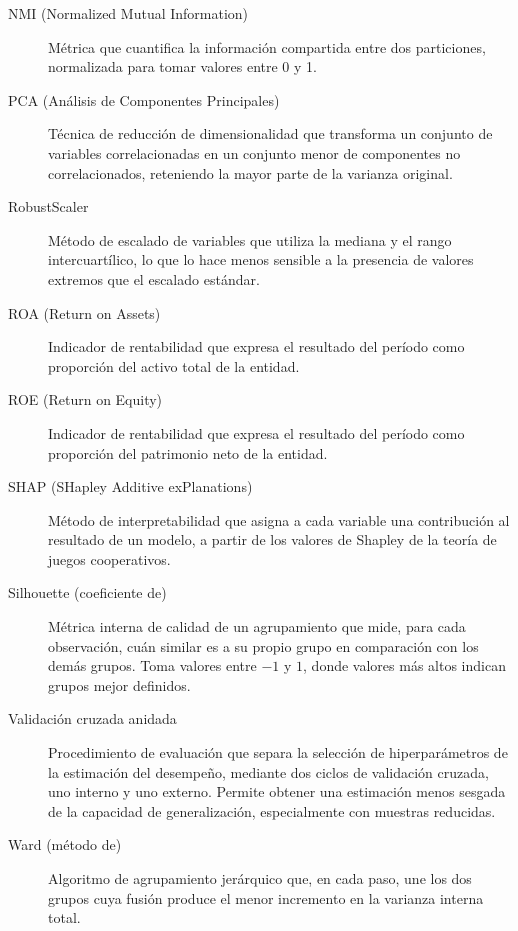 \documentclass[11pt,a4paper]{article}
\begin{document}
\begin{description}
  \item[NMI (Normalized Mutual Information)] Métrica que cuantifica la información compartida
  entre dos particiones, normalizada para tomar valores entre 0 y 1.

  \item[PCA (Análisis de Componentes Principales)] Técnica de reducción de dimensionalidad que
  transforma un conjunto de variables correlacionadas en un conjunto menor de componentes no
  correlacionados, reteniendo la mayor parte de la varianza original.

  \item[RobustScaler] Método de escalado de variables que utiliza la mediana y el rango
  intercuartílico, lo que lo hace menos sensible a la presencia de valores extremos que el
  escalado estándar.

  \item[ROA (Return on Assets)] Indicador de rentabilidad que expresa el resultado del período
  como proporción del activo total de la entidad.

  \item[ROE (Return on Equity)] Indicador de rentabilidad que expresa el resultado del período
  como proporción del patrimonio neto de la entidad.

  \item[SHAP (SHapley Additive exPlanations)] Método de interpretabilidad que asigna a cada
  variable una contribución al resultado de un modelo, a partir de los valores de Shapley de la
  teoría de juegos cooperativos.

  \item[Silhouette (coeficiente de)] Métrica interna de calidad de un agrupamiento que mide,
  para cada observación, cuán similar es a su propio grupo en comparación con los demás grupos.
  Toma valores entre $-1$ y $1$, donde valores más altos indican grupos mejor definidos.

  \item[Validación cruzada anidada] Procedimiento de evaluación que separa la selección de
  hiperparámetros de la estimación del desempeño, mediante dos ciclos de validación cruzada,
  uno interno y uno externo. Permite obtener una estimación menos sesgada de la capacidad de
  generalización, especialmente con muestras reducidas.

  \item[Ward (método de)] Algoritmo de agrupamiento jerárquico que, en cada paso, une los dos
  grupos cuya fusión produce el menor incremento en la varianza interna total.
\end{description}
\end{document}
